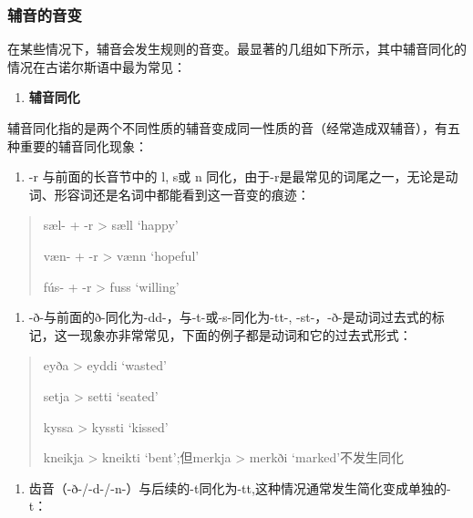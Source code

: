\subsubsection{辅音的音变}\label{辅音的音变}

在某些情况下，辅音会发生规则的音变。最显著的几组如下所示，其中辅音同化的情况在古诺尔斯语中最为常见：

\begin{enumerate}
  \def\labelenumi{\Alph{enumi}.}
  \item
        \label{_Ref117517666}{}\textbf{辅音同化}
\end{enumerate}

辅音同化指的是两个不同性质的辅音变成同一性质的音（经常造成双辅音），有五种重要的辅音同化现象：

\begin{enumerate}
  \def\labelenumi{(\alph{enumi})}
  \item
        \label{_Ref117517668}{}-r 与前面的长音节中的 l, s或 n
        同化，由于-r是最常见的词尾之一，无论是动词、形容词还是名词中都能看到这一音变的痕迹：
\end{enumerate}

\begin{quote}
  sæl- + -r \textgreater{} sæll `happy'

  væn- + -r \textgreater{} vænn `hopeful'

  fús- + -r \textgreater{} fuss `willing'
\end{quote}

\begin{enumerate}
  \def\labelenumi{(\alph{enumi})}
  \setcounter{enumi}{1}
  \item
        -ð-与前面的ð-同化为-dd-，与-t-或-s-同化为-tt-,
        -st-，-ð-是动词过去式的标记，这一现象亦非常常见，下面的例子都是动词和它的过去式形式：
\end{enumerate}

\begin{quote}
  eyða \textgreater{} eyddi `wasted'

  setja \textgreater{} setti `seated'

  kyssa \textgreater{} kyssti `kissed'

  kneikja \textgreater{} kneikti `bent';但merkja \textgreater{} merkði
  `marked'不发生同化
\end{quote}

\begin{enumerate}
  \def\labelenumi{(\alph{enumi})}
  \setcounter{enumi}{2}
  \item
        齿音（-ð-/-d-/-n-）与后续的-t同化为-tt,这种情况通常发生简化变成单独的-t：
\end{enumerate}


